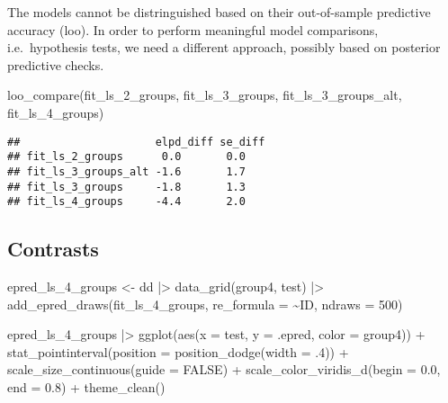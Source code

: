 \documentclass[
  man,floatsintext]{apa7}
\newenvironment{Shaded}{\begin{snugshade}}{\end{snugshade}}
\newcommand{\AttributeTok}[1]{\textcolor[rgb]{0.77,0.63,0.00}{#1}}
\newcommand{\ConstantTok}[1]{\textcolor[rgb]{0.00,0.00,0.00}{#1}}
\newcommand{\DecValTok}[1]{\textcolor[rgb]{0.00,0.00,0.81}{#1}}
\newcommand{\FloatTok}[1]{\textcolor[rgb]{0.00,0.00,0.81}{#1}}
\newcommand{\FunctionTok}[1]{\textcolor[rgb]{0.00,0.00,0.00}{#1}}
\newcommand{\NormalTok}[1]{#1}
\newcommand{\OtherTok}[1]{\textcolor[rgb]{0.56,0.35,0.01}{#1}}
\newcommand{\SpecialCharTok}[1]{\textcolor[rgb]{0.00,0.00,0.00}{#1}}
\begin{document}
The models cannot be distringuished based on their out-of-sample predictive accuracy (loo). In order to perform meaningful model comparisons, i.e.~hypothesis tests, we need a different approach, possibly based on posterior predictive checks.

\begin{Shaded}
\begin{Highlighting}[]
\FunctionTok{loo\_compare}\NormalTok{(fit\_ls\_2\_groups, }
\NormalTok{            fit\_ls\_3\_groups, }
\NormalTok{            fit\_ls\_3\_groups\_alt, }
\NormalTok{            fit\_ls\_4\_groups)}
\end{Highlighting}
\end{Shaded}

\begin{verbatim}
##                     elpd_diff se_diff
## fit_ls_2_groups      0.0       0.0   
## fit_ls_3_groups_alt -1.6       1.7   
## fit_ls_3_groups     -1.8       1.3   
## fit_ls_4_groups     -4.4       2.0
\end{verbatim}

\hypertarget{contrasts}{%
\subsection{Contrasts}\label{contrasts}}

\begin{Shaded}
\begin{Highlighting}[]
\NormalTok{epred\_ls\_4\_groups }\OtherTok{\textless{}{-}}\NormalTok{ dd }\SpecialCharTok{|\textgreater{}}
  \FunctionTok{data\_grid}\NormalTok{(group4, test) }\SpecialCharTok{|\textgreater{}}
  \FunctionTok{add\_epred\_draws}\NormalTok{(fit\_ls\_4\_groups,}
                  \AttributeTok{re\_formula =} \SpecialCharTok{\textasciitilde{}}\NormalTok{ID,}
                  \AttributeTok{ndraws =} \DecValTok{500}\NormalTok{)}
\end{Highlighting}
\end{Shaded}

\begin{Shaded}
\begin{Highlighting}[]
\NormalTok{epred\_ls\_4\_groups }\SpecialCharTok{|\textgreater{}}
  \FunctionTok{ggplot}\NormalTok{(}\FunctionTok{aes}\NormalTok{(}\AttributeTok{x =}\NormalTok{ test, }\AttributeTok{y =}\NormalTok{ .epred, }\AttributeTok{color =}\NormalTok{ group4)) }\SpecialCharTok{+}
  \FunctionTok{stat\_pointinterval}\NormalTok{(}\AttributeTok{position =} \FunctionTok{position\_dodge}\NormalTok{(}\AttributeTok{width =}\NormalTok{ .}\DecValTok{4}\NormalTok{)) }\SpecialCharTok{+}
  \FunctionTok{scale\_size\_continuous}\NormalTok{(}\AttributeTok{guide =} \ConstantTok{FALSE}\NormalTok{) }\SpecialCharTok{+}
  \FunctionTok{scale\_color\_viridis\_d}\NormalTok{(}\AttributeTok{begin =} \FloatTok{0.0}\NormalTok{, }\AttributeTok{end =} \FloatTok{0.8}\NormalTok{) }\SpecialCharTok{+}
  \FunctionTok{theme\_clean}\NormalTok{()}
\end{Highlighting}
\end{Shaded}
\end{document}

